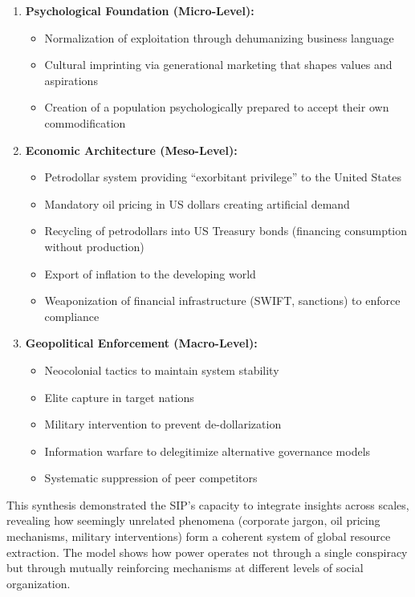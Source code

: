 \documentclass[11pt,a4paper]{article}
\begin{document}
\begin{enumerate}[leftmargin=*]
    \item \textbf{Psychological Foundation (Micro-Level):} 
    \begin{itemize}[nosep]
        \item Normalization of exploitation through dehumanizing business language \citep{dialogue0}
        \item Cultural imprinting via generational marketing that shapes values and aspirations \citep{dialogue1}
        \item Creation of a population psychologically prepared to accept their own commodification
    \end{itemize}
    
    \item \textbf{Economic Architecture (Meso-Level):} 
    \begin{itemize}[nosep]
        \item Petrodollar system providing ``exorbitant privilege'' to the United States \citep{dialogue2}
        \item Mandatory oil pricing in US dollars creating artificial demand
        \item Recycling of petrodollars into US Treasury bonds (financing consumption without production)
        \item Export of inflation to the developing world
        \item Weaponization of financial infrastructure (SWIFT, sanctions) to enforce compliance
    \end{itemize}
    
    \item \textbf{Geopolitical Enforcement (Macro-Level):}
    \begin{itemize}[nosep]
        \item Neocolonial tactics to maintain system stability \citep{dialogue3,dialogue7}
        \item Elite capture in target nations
        \item Military intervention to prevent de-dollarization
        \item Information warfare to delegitimize alternative governance models
        \item Systematic suppression of peer competitors
    \end{itemize}
\end{enumerate}

This synthesis demonstrated the SIP's capacity to integrate insights across scales, revealing how seemingly unrelated phenomena (corporate jargon, oil pricing mechanisms, military interventions) form a coherent system of global resource extraction. The model shows how power operates not through a single conspiracy but through mutually reinforcing mechanisms at different levels of social organization.
\end{document}
